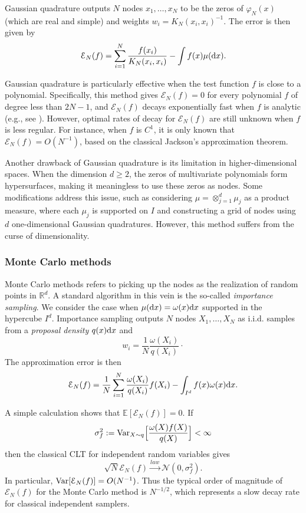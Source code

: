 Gaussian quadrature \cite{DavisRabi, Gautschi, BrassPetras} outputs $N$ nodes $x_1,\ldots,x_N$ to be the zeros of $\varphi_N(x)$ (which are real and simple) and weights $w_i = K_N(x_i,x_i)^{-1}$. The error is then given by
\[\mathcal E_N(f) = \sum_{i=1}^N \frac{f(x_i)}{K_N(x_i,x_i)} - \int f(x) \mu(\mathrm{d} x).\]

Gaussian quadrature is particularly effective when the test function $f$ is close to a polynomial. Specifically, this method gives $\mathcal E_N(f) =0$ for every polynomial $f$ of degree less than $2N-1$, and $\mathcal E_N(f)$ decays exponentially fast when $f$ is analytic (e.g., see \cite{GautschiVarga}). However, optimal rates of decay for $\mathcal E_N(f)$ are still unknown when $f$ is less regular. For instance, when $f$ is $C^1$, it is only known that $\mathcal E_N(f) = O(N^{-1})$, based on the classical Jackson's approximation theorem.

Another drawback of Gaussian quadrature is its limitation in higher-dimensional spaces. When the dimension $d\ge 2$, the zeros of multivariate polynomials form hypersurfaces, making it meaningless to use these zeros as nodes. Some modifications address this issue, such as considering $\mu = \otimes_{j=1}^d \mu_j$ as a product measure, where each $\mu_j$ is supported on $I$ and constructing a grid of nodes using $d$
one-dimensional Gaussian quadratures. However, this method suffers from the curse of dimensionality.

\subsubsection{Monte Carlo methods}
Monte Carlo methods \cite{MonteCarlobook} refers to picking up the nodes as the realization of random points in $\mathbb R^d$. A standard algorithm in this vein is the so-called \textit{importance sampling}. We consider the case when $\mu(\mathrm{d} x) = \omega(x) \mathrm{d} x$ supported in the hypercube $I^d$. Importance sampling outputs $N$ nodes $X_1,\ldots,X_N$ as i.i.d. samples from a \emph{proposal density} $q(x)\mathrm{d} x$ and 
\[ w_i = \frac{1}{N} \frac{\omega(X_i)}{q(X_i)} \cdot\]
The approximation error is then
\[\mathcal E_N(f) = \frac{1}{N}\sum_{i=1}^N \frac{\omega(X_i)}{q(X_i)} f(X_i) - \int_{I^d} f(x) \omega(x)\mathrm{d} x.\]

A simple calculation shows that $\mathbb E[\mathcal E_N(f)] = 0$.
If
\[ \sigma^2_f := \mathrm{Var}_{X\sim q} \Big [\frac{\omega(X)f(X)}{q(X)}  \Big ] < \infty \]
then the classical CLT for independent random variables gives
\[  \sqrt{N} \mathcal E_N(f) \overset{law}{\longrightarrow} \mathcal N(0,\sigma_f^2).\]
In particular, $\mathrm{Var}[\mathcal E_N(f)] = O(N^{-1})$.
Thus the typical order of magnitude of $\mathcal E_N(f)$ for the Monte Carlo method is $N^{-1/2}$,
which represents a slow decay rate for classical independent samplers. 

